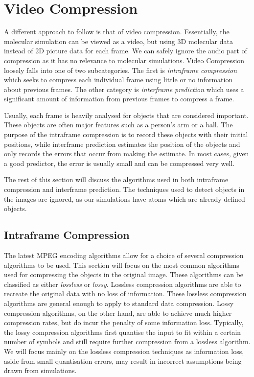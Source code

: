 \documentclass[a4paper,11pt]{report}
\begin{document}
\section{Video Compression}

A different approach to follow is that of video compression. Essentially, the molecular simulation can be viewed as a video, but using 3D molecular data instead of 2D picture data for each frame. We can safely ignore the audio part of compression as it has no relevance to molecular simulations. Video Compression loosely falls into one of two subcategories. The first is \emph{intraframe compression} which seeks to compress each individual frame using little or no information about previous frames. The other category is \emph{interframe prediction} which uses a significant amount of information from previous frames to compress a frame. 

Usually, each frame is heavily analysed for objects that are considered important. These objects are often major features such as a person's arm or a ball. The purpose of the intraframe compression is to record these objects with their initial positions, while interframe prediction estimates the position of the objects and only records the errors that occur from making the estimate. In most cases, given a good predictor, the error is usually small and can be compressed very well.

The rest of this section will discuss the algorithms used in both intraframe compression and interframe prediction. The techniques used to detect objects in the images are ignored, as our simulations have atoms which are already defined objects.

\subsection{Intraframe Compression}
\label{back_intra}

The latest MPEG encoding algorithms allow for a choice of several compression algorithms to be used\cite{gall1991mvc}. This section will focus on the most common algorithms used for compressing the objects in the original image. These algorithms can be classified as either \emph{lossless} or \emph{lossy}. Lossless compression algorithms are able to recreate the original data with no loss of information. These lossless compression algorithms are general enough to apply to standard data compression. Lossy compression algorithms, on the other hand, are able to achieve much higher compression rates, but do incur the penalty of some information loss. Typically, the lossy compression algorithms first quantise the input to fit within a certain number of symbols and still require further compression from a lossless algorithm. We will focus mainly on the lossless compression techniques as information loss, aside from small quantisation errors, may result in incorrect assumptions being drawn from simulations.  
\end{document}

